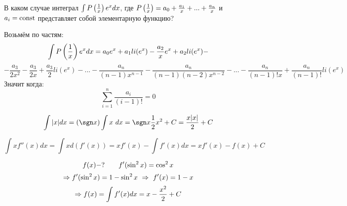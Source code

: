 \documentclass[main]{subfiles}
\begin{document}
    \begin{task}
        В каком случае интеграл $\int P\left(\frac{1}{x}\right) e^x dx$, где $P\left(\frac{1}{x}\right) = a_0 + \frac{a_1}{x} + ... + \frac{a_n}{x}$ и $a_i = \mathop{\rm const}\nolimits$ представляет собой элементарную функцию?
    \end{task}

    \begin{sol}
        Возьмём по частям:
        \[\int P\left(\frac{1}{x}\right) e^x dx = a_0 e^x + a_1 li(e^x) - \frac{a_2}{x} e^x + a_2 li(e^x) - \]
        \[- \frac{a_3}{2x^2} - \frac{a_3}{2x} + \frac{a_3}{2} li(e^x) - ... - \frac{a_n}{(n-1)x^{n-1}} - \frac{a_n}{(n-1)(n-2) x^{n-2}} - ... - \frac{a_n}{(n-1)! x} + \frac{a_n}{(n-1)!} li(e^x)\]
        Значит когда:
        \[\sum_{i = 1}^n \frac{a_i}{(i - 1)!} = 0\]
    \end{sol}

    \begin{Example}
        \[\int |x| dx = (\sgn x) \int x \ dx = \sgn x \frac{1}{2} x^2 + C = \frac{x|x|}{2} + C\]
    \end{Example}

    \begin{Example}
        \[\int x f''(x) dx = \int x d(f'(x)) = x f'(x) - \int f'(x) dx = x f'(x) - f(x) + C\]
    \end{Example}

    \begin{Example}
        \[f(x) - ? \qquad f'(\sin^2 x) = \cos^2 x\]
        \[\Rightarrow f'(\sin^2 x) = 1 - \sin^2 x \ \Rightarrow\  f'(x) = 1 - x\]
        \[\Rightarrow f(x) = \int f'(x) dx = x - \frac{x^2}{2} + C\]
    \end{Example}
\end{document}
